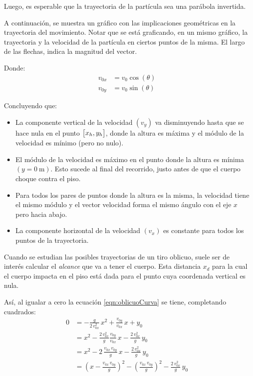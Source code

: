 Luego, es esperable que la trayectoria de la partícula sea una parábola invertida.

A continuación, se muestra un gráfico con las implicaciones geométricas en la trayectoria del movimiento.
Notar que se está graficando, en un mismo gráfico, la trayectoria y la velocidad de la partícula en ciertos puntos de la misma.
El largo de las flechas, indica la magnitud del vector.

\begin{center}
    \def\svgwidth{\linewidth}
    
\end{center}

Donde:
\begin{align*}
    v_{0x} &= v_0 \cos(\theta)
    \\
    v_{0y} &= v_0 \sin(\theta)
\end{align*}

Concluyendo que:

\begin{itemize}
    \item
    La componente vertical de la velocidad $(v_y)$ va disminuyendo hasta que se hace nula en el punto ${ \begin{bmatrix} x_h, y_h \end{bmatrix} }$, donde la altura es máxima y el módulo de la velocidad es mínimo (pero no nulo).
    
    \item
    El módulo de la velocidad es máximo en el punto donde la altura es mínima $(y=\SI{0}{\metre})$.
    Esto sucede al final del recorrido, justo antes de que el cuerpo choque contra el piso.
    
    \item Para todos los pares de puntos donde la altura es la misma, la velocidad tiene el mismo módulo y el vector velocidad forma el mismo ángulo con el eje $x$ pero hacia abajo.
    
    \item La componente horizontal de la velocidad $(v_x)$ es constante para todos los puntos de la trayectoria.
\end{itemize}

Cuando se estudian las posibles trayectorias de un tiro oblicuo, suele ser de interés calcular el \emph{alcance} que va a tener el cuerpo.
Esta distancia $x_d$ para la cual el cuerpo impacta en el piso está dada para el punto cuya coordenada vertical es nula.

Así, al igualar a cero la ecuación \ref{eqn:oblicuoCurva} se tiene, completando cuadrados:
\begin{align*}
    0 &= -\frac{g}{2 \, v_{0x}^2} \, x^2 + \frac{v_{0y}}{v_{0x}} \, x + y_0
    \\[1ex]
    &= x^2 - \frac{2 \, v_{0x}^2}{g} \frac{v_{0y}}{v_{0x}} \, x - \frac{2 \, v_{0x}^2}{g} \, y_0
    \\[1ex]
    &= x^2 - 2 \, \frac{v_{0x} \, v_{0y}}{g} \, x - \frac{2 \, v_{0x}^2}{g} \, y_0
    \\[1ex]
    &= \left(x - \frac{v_{0x} \, v_{0y}}{g}\right)^2 - \left(\frac{v_{0x} \, v_{0y}}{g}\right)^2 - \frac{2 \, v_{0x}^2}{g} \, y_0
\end{align*}

